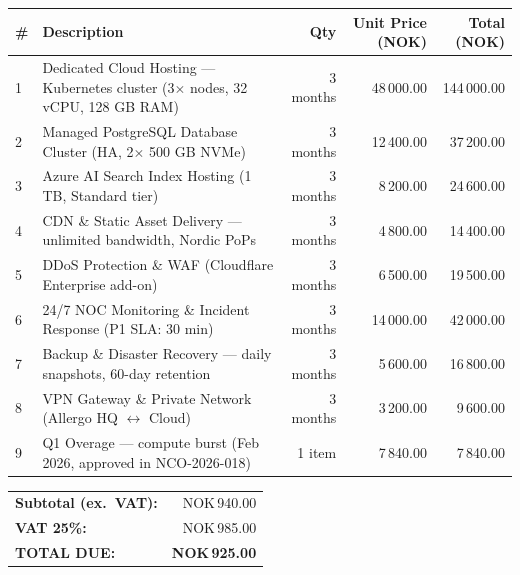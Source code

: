 \documentclass[a4paper,11pt]{article}
\begin{document}
\vspace{16pt}

\begin{tabularx}{\textwidth}{>{\raggedright}p{0.5cm} >{\raggedright}X r r r}
  \rowcolor{brand}
  \color{white}\textbf{\#} &
  \color{white}\textbf{Description} &
  \color{white}\textbf{Qty} &
  \color{white}\textbf{Unit Price (NOK)} &
  \color{white}\textbf{Total (NOK)} \\
  \midrule
  \rowcolor{lightgray}
  1 & Dedicated Cloud Hosting — Kubernetes cluster (3$\times$ nodes, 32 vCPU, 128 GB RAM) &
    3 months & 48\,000.00 & 144\,000.00 \\
  2 & Managed PostgreSQL Database Cluster (HA, 2$\times$ 500 GB NVMe) &
    3 months & 12\,400.00 & 37\,200.00 \\
  \rowcolor{lightgray}
  3 & Azure AI Search Index Hosting (1 TB, Standard tier) &
    3 months & 8\,200.00 & 24\,600.00 \\
  4 & CDN \& Static Asset Delivery — unlimited bandwidth, Nordic PoPs &
    3 months & 4\,800.00 & 14\,400.00 \\
  \rowcolor{lightgray}
  5 & DDoS Protection \& WAF (Cloudflare Enterprise add-on) &
    3 months & 6\,500.00 & 19\,500.00 \\
  6 & 24/7 NOC Monitoring \& Incident Response (P1 SLA: 30 min) &
    3 months & 14\,000.00 & 42\,000.00 \\
  \rowcolor{lightgray}
  7 & Backup \& Disaster Recovery — daily snapshots, 60-day retention &
    3 months & 5\,600.00 & 16\,800.00 \\
  8 & VPN Gateway \& Private Network (Allergo HQ $\leftrightarrow$ Cloud) &
    3 months & 3\,200.00 & 9\,600.00 \\
  \rowcolor{lightgray}
  9 & Q1 Overage — compute burst (Feb 2026, approved in NCO-2026-018) &
    1 item & 7\,840.00 & 7\,840.00 \\
  \bottomrule
\end{tabularx}

\vspace{12pt}

\hfill
\begin{tabular}{lr}
  \toprule
  \textbf{Subtotal (ex.\ VAT):} & NOK\;315\,940.00 \\
  \textbf{VAT 25\%:}            & NOK\;\;\;78\,985.00 \\
  \midrule
  \rowcolor{brand}
  \color{white}\textbf{TOTAL DUE:} & \color{white}\textbf{NOK\;394\,925.00} \\
  \bottomrule
\end{tabular}
\end{document}
